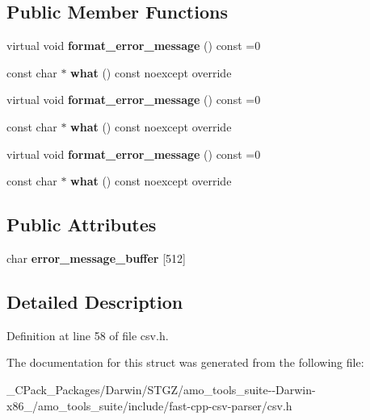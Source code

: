 \subsection*{Public Member Functions}
\begin{DoxyCompactItemize}
\item 
\mbox{\label{structio_1_1error_1_1base_a7d9ff6a31b716a24f056cf8a3e15191d}} 
virtual void {\bfseries format\+\_\+error\+\_\+message} () const =0
\item 
\mbox{\label{structio_1_1error_1_1base_a26af2f57ec9ddc3600aaffde8056535b}} 
const char $\ast$ {\bfseries what} () const noexcept override
\item 
\mbox{\label{structio_1_1error_1_1base_a7d9ff6a31b716a24f056cf8a3e15191d}} 
virtual void {\bfseries format\+\_\+error\+\_\+message} () const =0
\item 
\mbox{\label{structio_1_1error_1_1base_a26af2f57ec9ddc3600aaffde8056535b}} 
const char $\ast$ {\bfseries what} () const noexcept override
\item 
\mbox{\label{structio_1_1error_1_1base_a7d9ff6a31b716a24f056cf8a3e15191d}} 
virtual void {\bfseries format\+\_\+error\+\_\+message} () const =0
\item 
\mbox{\label{structio_1_1error_1_1base_a26af2f57ec9ddc3600aaffde8056535b}} 
const char $\ast$ {\bfseries what} () const noexcept override
\end{DoxyCompactItemize}
\subsection*{Public Attributes}
\begin{DoxyCompactItemize}
\item 
\mbox{\label{structio_1_1error_1_1base_aa88f2c87655a2d07b10c02d629cd5d85}} 
char {\bfseries error\+\_\+message\+\_\+buffer} \mbox{[}512\mbox{]}
\end{DoxyCompactItemize}


\subsection{Detailed Description}


Definition at line 58 of file csv.\+h.



The documentation for this struct was generated from the following file\+:\begin{DoxyCompactItemize}
\item 
\+\_\+\+C\+Pack\+\_\+\+Packages/\+Darwin/\+S\+T\+G\+Z/amo\+\_\+tools\+\_\+suite-\/-\/\+Darwin-\/x86\+\_/amo\+\_\+tools\+\_\+suite/include/fast-\/cpp-\/csv-\/parser/csv.\+h\end{DoxyCompactItemize}

